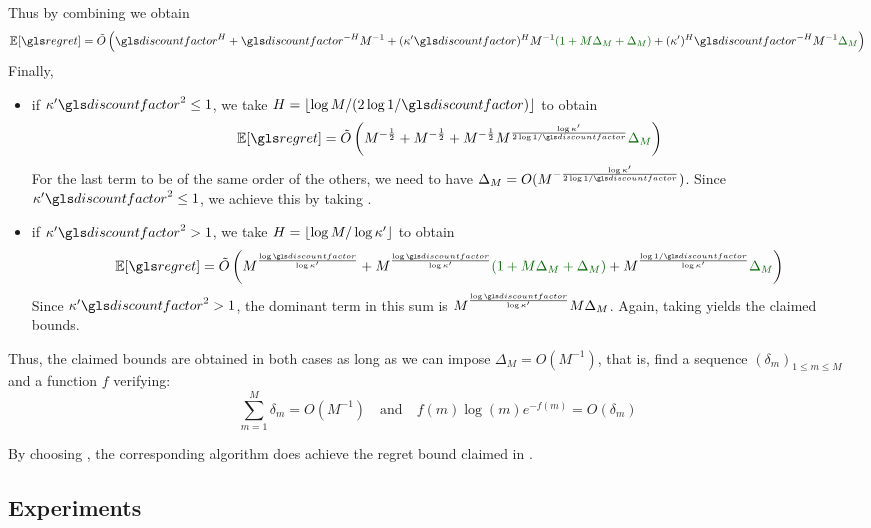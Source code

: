Thus by combining  we obtain
\begin{equation*}
\expectedvalue [\regret] = \tilde{O}\left(\discount^H + \discount^{-H}M^{-1} + (\kappa' \discount)^{H}M^{-1}\diff{(1+M\Delta_M+\Delta_M)} + (\kappa')^H\discount^{-H}M^{-1}\diff{\Delta_M}\right)
\end{equation*}
Finally,
\begin{itemize}
	\item if $\kappa'\discount^2 \leq 1$, we take $H = \floor{\log M / (2\log 1/\discount)}$ to obtain
	\begin{equation*}
	\expectedvalue [\regret] = \tilde{O}\left(M^{-\frac{1}{2}} + M^{-\frac{1}{2}} + M^{-\frac{1}{2}}M^{\frac{\log \kappa'}{2\log 1/\discount}} \diff{\Delta_M}\right)
	\end{equation*}
	For the last term to be of the same order of the others, we need to have $\Delta_M = O(M^{-\frac{\log \kappa'}{2\log 1/\discount}})$. Since $\kappa'\discount^2 \leq 1$, we achieve this by taking .
	\item if $\kappa'\discount^2 > 1$, we take $H = \lfloor\log M / \log \kappa'\rfloor$ to obtain
	\begin{equation*}
	\expectedvalue [\regret] = \tilde{O}\left(M^{\frac{\log \discount}{\log \kappa'}} + M^{\frac{\log \discount}{\log \kappa'}}\diff{(1+M\Delta_M+\Delta_M)} + M^{\frac{\log 1/\discount}{\log \kappa'}}\diff{\Delta_M}\right)
	\end{equation*}
	Since $\kappa'\discount^2 > 1$, the dominant term in this sum is $M^{\frac{\log \discount}{\log \kappa'}}M\Delta_M$. Again, taking  yields the claimed bounds.
\end{itemize}
Thus, the claimed bounds are obtained in both cases as long as we can impose $\Delta_M = O(M^{-1})$, that is, find a sequence $(\delta_m)_{1\leq m\leq M}$ and a function $f$ verifying:
\begin{equation}
\sum_{m=1}^M \delta_m = O(M^{-1})\quad \text{and}\quad f(m)\log (m) e^{-f(m)} = O(\delta_m)
\end{equation}

By choosing , the corresponding \KLOLOP algorithm does achieve the regret bound claimed in .


\subsection{Experiments}
\label{sec:planning-experiments}

